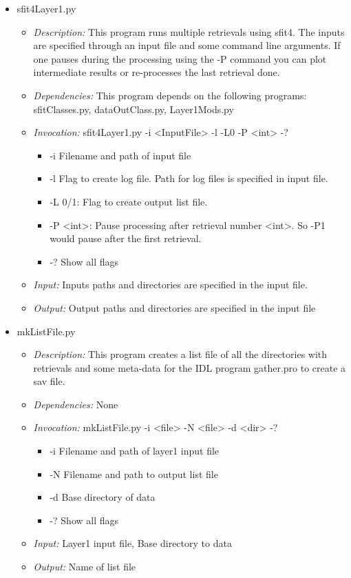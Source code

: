 \documentclass[12pt, letterpaper]{article}
\begin{document}
\begin{itemize}
\item sfit4Layer1.py
\begin{itemize} 
\item \textit{Description:} This program runs multiple retrievals using sfit4. The inputs are specified through an input file and some command line arguments. If one pauses during the processing using the -P command you can plot intermediate results or re-processes the last retrieval done.
\item \textit{Dependencies:} This program depends on the following programs: sfitClasses.py, dataOutClass.py, Layer1Mods.py
\item \textit{Invocation:} sfit4Layer1.py -i <InputFile> -l -L0 -P <int> -?
\begin{itemize}
\item -i Filename and path of input file
\item -l Flag to create log file. Path for log files is specified in input file.
\item -L 0/1: Flag to create output list file. 
\item -P <int>: Pause processing after retrieval number <int>. So -P1 would pause after the first retrieval.
\item -? Show all flags
\end{itemize}
\item \textit{Input:} Inputs paths and directories are specified in the input file.
\item \textit{Output:} Output paths and directories are specified in the input file
\end{itemize}
\end{itemize}

\begin{itemize}
\item mkListFile.py
\begin{itemize}
\item \textit{Description:} This program creates a list file of all the directories with retrievals and some meta-data for the IDL program gather.pro to create a sav file.
\item \textit{Dependencies:} None
\item \textit{Invocation:} mkListFile.py -i <file> -N <file> -d <dir> -?
\begin{itemize}
\item -i Filename and path of layer1 input file
\item -N Filename and path to output list file
\item -d Base directory of data 
\item -? Show all flags
\end{itemize}
\item \textit{Input:} Layer1 input file, Base directory to data
\item \textit{Output:} Name of list file
\end{itemize}
\end{itemize}
\end{document}
